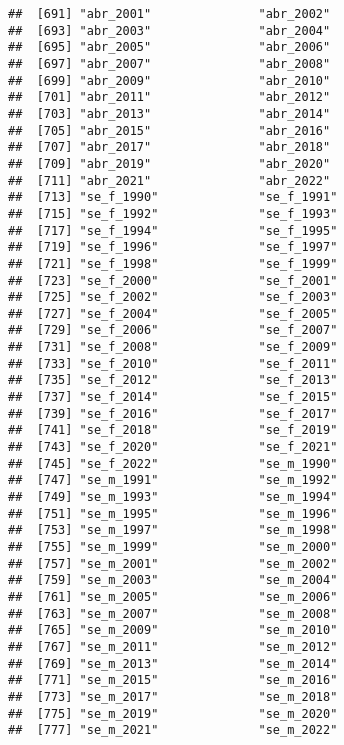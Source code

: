 \documentclass[
]{article}
\begin{document}
\begin{verbatim}
##  [691] "abr_2001"               "abr_2002"              
##  [693] "abr_2003"               "abr_2004"              
##  [695] "abr_2005"               "abr_2006"              
##  [697] "abr_2007"               "abr_2008"              
##  [699] "abr_2009"               "abr_2010"              
##  [701] "abr_2011"               "abr_2012"              
##  [703] "abr_2013"               "abr_2014"              
##  [705] "abr_2015"               "abr_2016"              
##  [707] "abr_2017"               "abr_2018"              
##  [709] "abr_2019"               "abr_2020"              
##  [711] "abr_2021"               "abr_2022"              
##  [713] "se_f_1990"              "se_f_1991"             
##  [715] "se_f_1992"              "se_f_1993"             
##  [717] "se_f_1994"              "se_f_1995"             
##  [719] "se_f_1996"              "se_f_1997"             
##  [721] "se_f_1998"              "se_f_1999"             
##  [723] "se_f_2000"              "se_f_2001"             
##  [725] "se_f_2002"              "se_f_2003"             
##  [727] "se_f_2004"              "se_f_2005"             
##  [729] "se_f_2006"              "se_f_2007"             
##  [731] "se_f_2008"              "se_f_2009"             
##  [733] "se_f_2010"              "se_f_2011"             
##  [735] "se_f_2012"              "se_f_2013"             
##  [737] "se_f_2014"              "se_f_2015"             
##  [739] "se_f_2016"              "se_f_2017"             
##  [741] "se_f_2018"              "se_f_2019"             
##  [743] "se_f_2020"              "se_f_2021"             
##  [745] "se_f_2022"              "se_m_1990"             
##  [747] "se_m_1991"              "se_m_1992"             
##  [749] "se_m_1993"              "se_m_1994"             
##  [751] "se_m_1995"              "se_m_1996"             
##  [753] "se_m_1997"              "se_m_1998"             
##  [755] "se_m_1999"              "se_m_2000"             
##  [757] "se_m_2001"              "se_m_2002"             
##  [759] "se_m_2003"              "se_m_2004"             
##  [761] "se_m_2005"              "se_m_2006"             
##  [763] "se_m_2007"              "se_m_2008"             
##  [765] "se_m_2009"              "se_m_2010"             
##  [767] "se_m_2011"              "se_m_2012"             
##  [769] "se_m_2013"              "se_m_2014"             
##  [771] "se_m_2015"              "se_m_2016"             
##  [773] "se_m_2017"              "se_m_2018"             
##  [775] "se_m_2019"              "se_m_2020"             
##  [777] "se_m_2021"              "se_m_2022"             

\end{verbatim}
\end{document}

